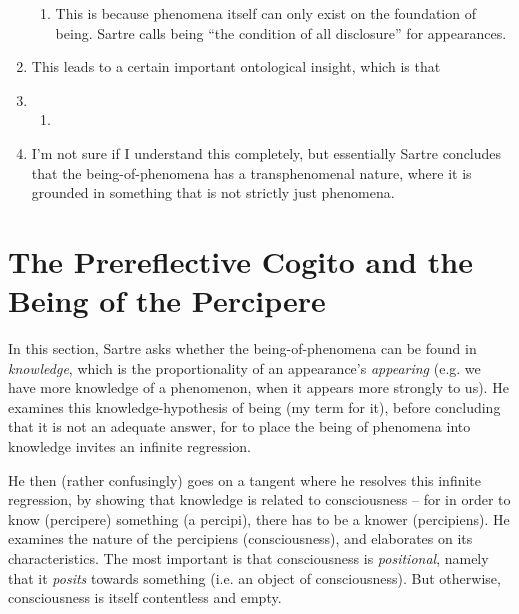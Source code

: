 \begin{enumerate}
\begin{enumerate}
    \item This is because phenomena itself can only exist on the foundation of being. Sartre calls being \enquote{the condition of all disclosure} for appearances.
  \end{enumerate}
  \item This leads to a certain important ontological insight, which is that \emph{}
  \item {}
  \begin{enumerate}
    \item {}
  \end{enumerate}
  \item I'm not sure if I understand this completely, but essentially Sartre concludes that the being-of-phenomena has a transphenomenal nature, where it is grounded in something that is not strictly just phenomena.
\end{enumerate}

\section{The Prereflective Cogito and the Being of the Percipere}
In this section, Sartre asks whether the being-of-phenomena can be found in \emph{knowledge}, which is the proportionality of an appearance's \emph{appearing} (e.g. we have more knowledge of a phenomenon, when it appears more strongly to us). He examines this knowledge-hypothesis of being (my term for it), before concluding that it is not an adequate answer, for to place the being of phenomena into knowledge invites an infinite regression.

He then (rather confusingly) goes on a tangent where he resolves this infinite regression, by showing that knowledge is related to consciousness -- for in order to know (percipere) something (a percipi), there has to be a knower (percipiens).
He examines the nature of the percipiens (consciousness), and elaborates on its characteristics. The most important is that consciousness is \emph{positional}, namely that it \emph{posits} towards something (i.e. an object of consciousness). But otherwise, consciousness is itself contentless and empty.

